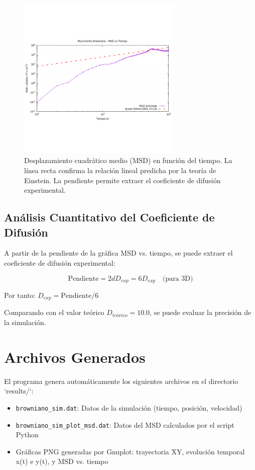 \documentclass[11pt,a4paper]{article}
\begin{document}
\begin{figure}[h!]
    \centering
    \includegraphics[width=0.7\textwidth]{../results/browniano_sim_plot_msd_vs_t.png}
    \caption{Desplazamiento cuadrático medio (MSD) en función del tiempo. La línea recta confirma la relación lineal predicha por la teoría de Einstein. La pendiente permite extraer el coeficiente de difusión experimental.}
    \label{fig:msd}
\end{figure}

\subsection{Análisis Cuantitativo del Coeficiente de Difusión}
A partir de la pendiente de la gráfica MSD vs. tiempo, se puede extraer el coeficiente de difusión experimental:

\begin{equation}
    \text{Pendiente} = 2dD_{exp} = 6D_{exp} \quad \text{(para 3D)}
\end{equation}

Por tanto: $D_{exp} = \text{Pendiente}/6$

Comparando con el valor teórico $D_{teórico} = 10.0$, se puede evaluar la precisión de la simulación.

\section{Archivos Generados}

El programa genera automáticamente los siguientes archivos en el directorio `results/`:

\begin{itemize}
    \item \texttt{browniano\_sim.dat}: Datos de la simulación (tiempo, posición, velocidad)
    \item \texttt{browniano\_sim\_plot\_msd.dat}: Datos del MSD calculados por el script Python
    \item Gráficas PNG generadas por Gnuplot: trayectoria XY, evolución temporal x(t) e y(t), y MSD vs. tiempo
\end{itemize}
\end{document}
